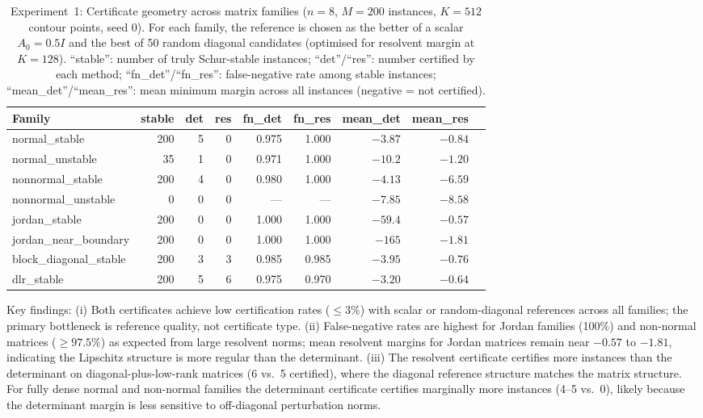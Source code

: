 \documentclass{article}
\theoremstyle{definition}
\begin{document}
\begin{table}[t]
\centering
\caption{Experiment~1: Certificate geometry across matrix families
($n=8$, $M=200$ instances, $K=512$ contour points, seed 0).
For each family, the reference is chosen as the better of a scalar
$A_0 = 0.5I$ and the best of 50 random diagonal candidates (optimised
for resolvent margin at $K=128$).
``stable'': number of truly Schur-stable instances; ``det''/``res'':
number certified by each method; ``fn\_det''/``fn\_res'': false-negative
rate among stable instances; ``mean\_det''/``mean\_res'': mean minimum
margin across all instances (negative = not certified).}
\label{tab:synthetic}
\begin{tabular}{lrrrrrrrr}
\toprule
Family & stable & det & res & fn\_det & fn\_res & mean\_det & mean\_res \\
\midrule
normal\_stable         & 200 &   5 &  0 & 0.975 & 1.000 & $-3.87$ & $-0.84$ \\
normal\_unstable       &  35 &   1 &  0 & 0.971 & 1.000 & $-10.2$ & $-1.20$ \\
nonnormal\_stable      & 200 &   4 &  0 & 0.980 & 1.000 & $-4.13$ & $-6.59$ \\
nonnormal\_unstable    &   0 &   0 &  0 &  ---  &  ---  & $-7.85$ & $-8.58$ \\
jordan\_stable         & 200 &   0 &  0 & 1.000 & 1.000 & $-59.4$ & $-0.57$ \\
jordan\_near\_boundary & 200 &   0 &  0 & 1.000 & 1.000 & $-165$ & $-1.81$ \\
block\_diagonal\_stable& 200 &   3 &  3 & 0.985 & 0.985 & $-3.95$ & $-0.76$ \\
dlr\_stable            & 200 &   5 &  6 & 0.975 & 0.970 & $-3.20$ & $-0.64$ \\
\bottomrule
\end{tabular}
\end{table}

Key findings:
(i) Both certificates achieve low certification rates ($\leq 3\%$) with
    scalar or random-diagonal references across all families; the primary
    bottleneck is reference quality, not certificate type.
(ii) False-negative rates are highest for Jordan families (100\%) and
    non-normal matrices ($\geq 97.5\%$) as expected from large resolvent
    norms; mean resolvent margins for Jordan matrices remain near $-0.57$
    to $-1.81$, indicating the Lipschitz structure is more regular than
    the determinant.
(iii) The resolvent certificate certifies more instances than the determinant on
    diagonal-plus-low-rank matrices (6 vs.\ 5 certified), where
    the diagonal reference structure matches the matrix structure.
    For fully dense normal and non-normal families the determinant
    certificate certifies marginally more instances (4--5 vs.\ 0),
    likely because the determinant margin is less sensitive to
    off-diagonal perturbation norms.
\end{document}
